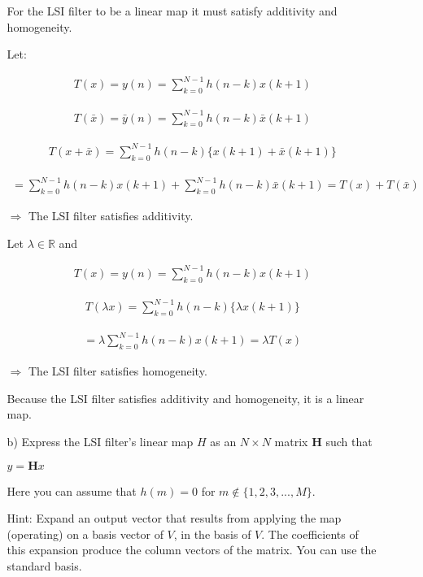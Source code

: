 \documentclass[fleqn]{article}
\begin{document}
\begin{enumerate}[nolistsep]
\begin{enumerate}
				For the LSI filter to be a linear map it must satisfy additivity and homogeneity.
			
				Let:
			
				\begin{align*}
					T(x) = y(n) = \sum_{k=0}^{N-1}{h(n-k)x(k+1)}
				\end{align*}
			
				\begin{align*}
					T(\bar{x}) = \bar{y}(n) = \sum_{k=0}^{N-1}{h(n-k)\bar{x}(k+1)}
				\end{align*}
			
				\begin{align*}
					T(x + \bar{x}) = \sum_{k=0}^{N-1}{h(n-k)\{x(k+1) + \bar{x}(k+1)\}}
				\end{align*}
			
				\begin{align*}
				 	= \sum_{k=0}^{N-1}{h(n-k)x(k+1)} + \sum_{k=0}^{N-1}{h(n-k)\bar{x}(k+1)} = T(x) + T(\bar{x})
				\end{align*}
			
				$\Rightarrow$ The LSI filter satisfies additivity.
			
				Let $\lambda \in \mathbb{R}$ and
			
				\begin{align*}
					T(x) = y(n) = \sum_{k=0}^{N-1}{h(n-k)x(k+1)}
				\end{align*}
			
				\begin{align*}
					T(\lambda x) = \sum_{k=0}^{N-1}{h(n-k)\{\lambda x(k+1)\}}
				\end{align*}
			
				\begin{align*}
				= \lambda\sum_{k=0}^{N-1}{h(n-k) x(k+1)} = \lambda T(x)
				\end{align*}
			
				$\Rightarrow$ The LSI filter satisfies homogeneity.
			
				Because the LSI filter satisfies additivity and homogeneity, it is a linear map.
			
			\item[b)] Express the LSI filter's linear map $H$ as an $N \times N$ matrix $\mathbf{H}$ such that
			
			\centerline{	$y = \mathbf{H}x$}
			
			Here you can assume that $h(m) = 0$ for $m \not\in \{1,2,3,...,M\}$.
			
			Hint: Expand an output vector that results from applying the map (operating) on a basis vector of $V$, in the basis of $V$. The coefficients of this expansion produce the column vectors of the matrix. You can use the standard basis.


\end{enumerate}
\end{enumerate}
\end{document}
